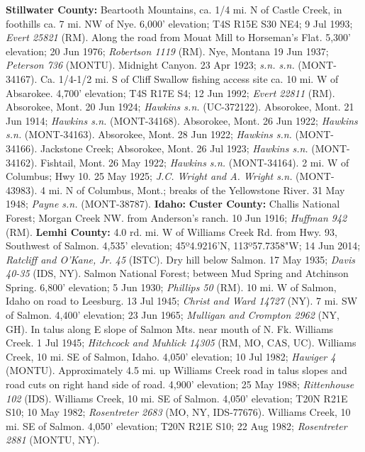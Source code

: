 \textbf{Stillwater County:}
Beartooth Mountains, ca. 1/4 mi. N of Castle Creek, in foothills ca. 7 mi. NW
of Nye. 6,000’ elevation; T4S R15E S30 NE4; 9 Jul 1993;
\textit{Evert 25821} (RM).
Along the road from Mouat Mill to Horseman’s Flat. 5,300’ elevation;
20 Jun 1976; \textit{Robertson 1119} (RM).
Nye, Montana 19 Jun 1937; \textit{Peterson 736} (MONTU).
Midnight Canyon. 23 Apr 1923; \textit{s.n. s.n.} (MONT-34167).
Ca. 1/4-1/2 mi. S of Cliff Swallow fishing access site ca. 10 mi. W of
Absarokee. 4,700’ elevation; T4S R17E S4; 12 Jun 1992;
\textit{Evert 22811} (RM).
Absorokee, Mont. 20 Jun 1924; \textit{Hawkins s.n.} (UC-372122).
Absorokee, Mont. 21 Jun 1914; \textit{Hawkins s.n.} (MONT-34168).
Absorokee, Mont. 26 Jun 1922; \textit{Hawkins s.n.} (MONT-34163).
Absorokee, Mont. 28 Jun 1922; \textit{Hawkins s.n.} (MONT-34166).
Jackstone Creek; Absorokee, Mont. 26 Jul 1923;
\textit{Hawkins s.n.} (MONT-34162).
Fishtail, Mont. 26 May 1922; \textit{Hawkins s.n.} (MONT-34164).
2 mi. W of Columbus; Hwy 10. 25 May 1925;
\textit{J.C. Wright and A. Wright s.n.} (MONT-43983).
4 mi. N of Columbus, Mont.; breaks of the Yellowstone River. 31 May 1948;
\textit{Payne s.n.} (MONT-38787).
  \textbf{Idaho:}
  \textbf{Custer County:}
Challis National Forest; Morgan Creek NW. from Anderson's ranch. 10 Jun 1916;
\textit{Huffman 942} (RM).
  \textbf{Lemhi County:}
4.0 rd. mi. W of Williams Creek Rd. from Hwy. 93, Southwest of Salmon.
4,535' elevation; 45º4.9216'N, 113º57.7358"W; 14 Jun 2014;
\textit{Ratcliff and O'Kane, Jr. 45} (ISTC).
Dry hill below Salmon. 17 May 1935; \textit{Davis 40-35} (IDS, NY).
Salmon National Forest; between Mud Spring and Atchinson Spring.
6,800' elevation; 5 Jun 1930; \textit{Phillips 50} (RM).
10 mi. W of Salmon, Idaho on road to Leesburg. 13 Jul 1945;
\textit{Christ and Ward 14727} (NY).
7 mi. SW of Salmon.  4,400' elevation; 23 Jun 1965;
\textit{Mulligan and Crompton 2962} (NY, GH).
In talus along E slope of Salmon Mts. near mouth of N. Fk. Williams Creek.
1 Jul 1945; \textit{Hitchcock and Muhlick 14305} (RM, MO, CAS, UC).
Williams Creek, 10 mi. SE of Salmon, Idaho. 4,050' elevation; 10 Jul 1982;
\textit{Hawiger 4} (MONTU).
Approximately 4.5 mi. up Williams Creek road in talus slopes and road cuts on
right hand side of road. 4,900' elevation; 25 May 1988;
\textit{Rittenhouse 102} (IDS).
Williams Creek, 10 mi. SE of Salmon. 4,050' elevation; T20N R21E S10;
10 May 1982; \textit{Rosentreter 2683} (MO, NY, IDS-77676).
Williams Creek, 10 mi. SE of Salmon. 4,050' elevation; T20N R21E S10;
22 Aug 1982; \textit{Rosentreter 2881} (MONTU, NY).
